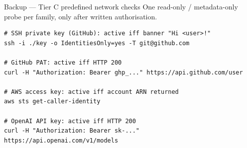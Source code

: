 \documentclass[aspectratio=169]{beamer}
\begin{document}
\begin{frame}[fragile]{Backup --- Tier C predefined network checks}
    \begingroup\small One read-only / metadata-only probe per family, only after written
    authorisation.\par\endgroup
    \begin{lstlisting}[basicstyle=\ttfamily\footnotesize,breaklines=true,frame=single]
# SSH private key (GitHub): active iff banner "Hi <user>!"
ssh -i ./key -o IdentitiesOnly=yes -T git@github.com

# GitHub PAT: active iff HTTP 200
curl -H "Authorization: Bearer ghp_..." https://api.github.com/user

# AWS access key: active iff account ARN returned
aws sts get-caller-identity

# OpenAI API key: active iff HTTP 200
curl -H "Authorization: Bearer sk-..." https://api.openai.com/v1/models
    \end{lstlisting}
\end{frame}
\end{document}
